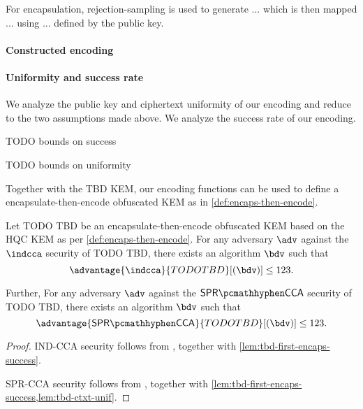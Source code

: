 For encapsulation, rejection-sampling is used to generate ... which is then mapped ... using ... defined by the public key.

\paragraph{Constructed encoding}
\paragraph{Uniformity and success rate}

We analyze the public key and ciphertext uniformity of our encoding and reduce to the two assumptions made above. We analyze the success rate of our encoding.

\begin{lemma}[[First-encaps Success Probability of TODO TBD]
\label{lem:hqc-first-encaps-success}
    TODO bounds on success
\end{lemma}

\begin{lemma}
\label{lem:hqc-ctxt-unif}
    TODO bounds on uniformity
\end{lemma}

Together with the TBD KEM, our encoding functions can be used to define a encapsulate-then-encode obfuscated KEM as in \cref{def:encaps-then-encode}.

\begin{theorem}
    Let TODO TBD be an encapsulate-then-encode obfuscated KEM based on the HQC KEM as per \cref{def:encaps-then-encode}. For any adversary $\adv$ against the $\indcca$ security of TODO TBD, there exists an algorithm $\bdv$ such that
    \[ \advantage{\indcca}{TODO TBD}[(\bdv)] \leq 123. \]

    Further,  For any adversary $\adv$ against the $\sprcca$ security of TODO TBD, there exists an algorithm $\bdv$ such that
    \[ \advantage{\sprcca}{TODO TBD}[(\bdv)] \leq 123. \]
\end{theorem}
\begin{proof}
    IND-CCA security follows from \cite[Theorem~2.12]{CCS:GunSteVei24}, together with \cref{lem:tbd-first-encaps-success}.
    
    SPR-CCA security follows from \cite[Theorem~2.13]{CCS:GunSteVei24}, together with \cref{lem:tbd-first-encaps-success,lem:tbd-ctxt-unif}.
\end{proof}